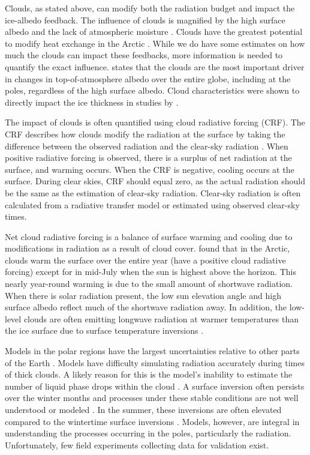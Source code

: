 Clouds, as stated above, can modify both the radiation budget and impact the ice-albedo feedback. The influence of clouds is magnified by the high surface albedo and the lack of atmospheric moisture \citep{shupe:2003}. Clouds have the greatest potential to modify heat exchange in the Arctic \citep{intrieri:2002}. While we do have some estimates on how much the clouds can impact these feedbacks, more information is needed to quantify the exact influence. \citet{sledd:2019} states that the clouds are the most important driver in changes in top-of-atmosphere albedo over the entire globe, including at the poles, regardless of the high surface albedo. Cloud characteristics were shown to directly impact the ice thickness in studies by \citet{curry:1992, beesley:2007}.  

The impact of clouds is often quantified using cloud radiative forcing (CRF). The CRF describes how clouds modify the radiation at the surface by taking the difference between the observed radiation and the clear-sky radiation \citep{ramanathan:1989}. When positive radiative forcing is observed, there is a surplus of net radiation at the surface, and warming occurs. When the CRF is negative, cooling occurs at the surface. During clear skies, CRF should equal zero, as the actual radiation should be the same as the estimation of clear-sky radiation. Clear-sky radiation is often calculated from a radiative transfer model or estimated using observed clear-sky times.

Net cloud radiative forcing is a balance of surface warming and cooling due to modifications in radiation as a result of cloud cover. \citet{curry:1992, intrieri:2002} found that in the Arctic, clouds warm the surface over the entire year (have a positive cloud radiative forcing) except for in mid-July when the sun is highest above the horizon. This nearly year-round warming is due to the small amount of shortwave radiation. When there is solar radiation present, the low sun elevation angle and high surface albedo reflect much of the shortwave radiation away. In addition, the low-level clouds are often emitting longwave radiation at warmer temperatures than the ice surface due to surface temperature inversions \citep{shupe:2003}.

Models in the polar regions have the largest uncertainties relative to other parts of the Earth \citep{holland:2003, AACI:05}. Models have difficulty simulating radiation accurately during times of thick clouds. A likely reason for this is the model’s inability to estimate the number of liquid phase drops within the cloud \citep{graham:2017}. A surface inversion often persists over the winter months and processes under these stable conditions are not well understood or modeled \citep{tastula:2012}. In the summer, these inversions are often elevated compared to the wintertime surface inversions \citep{serreze:1992}. Models, however, are integral in understanding the processes occurring in the poles, particularly the radiation.  Unfortunately, few field experiments collecting data for validation exist.

